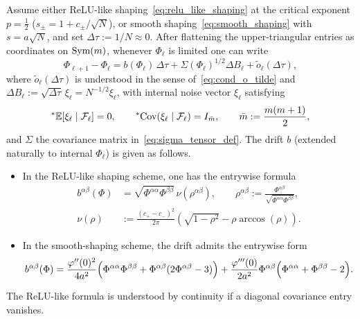 \begin{theorem}\label{thm:kem_increment}
Assume either ReLU-like shaping~\eqref{eq:relu_like_shaping} at the critical exponent $p = \frac{1}{2}$ ($s_\pm = 1 + c_\pm/\sqrt{N}$), or smooth shaping~\eqref{eq:smooth_shaping} with $s = a\sqrt{N}$, and set $\Delta\tau := 1/N \approx 0$. After flattening the upper-triangular entries as coordinates on $\operatorname{Sym}(m)$, whenever $\Phi_\ell$ is limited one can write
\begin{equation}\label{eq:kem_step}
\Phi_{\ell+1} - \Phi_\ell = b(\Phi_\ell)\,\Delta\tau + \Sigma(\Phi_\ell)^{1/2}\Delta B_\ell + \tilde{o}_\ell(\Delta\tau),
\end{equation}
where $\tilde{o}_\ell(\Delta\tau)$ is understood in the sense of~\eqref{eq:cond_o_tilde} and $\Delta B_\ell := \sqrt{\Delta\tau}\,\xi_\ell = N^{-1/2}\xi_\ell$, with internal noise vector $\xi_\ell$ satisfying
\begin{equation}\label{eq:xi_cond_cov}
{}^*\mathbb{E}[\xi_\ell \mid \mathcal{F}_\ell] = 0, \qquad {}^*\!\operatorname{Cov}(\xi_\ell \mid \mathcal{F}_\ell) = I_{\bar{m}}, \qquad \bar{m} := \frac{m(m+1)}{2},
\end{equation}
and $\Sigma$ the covariance matrix in~\eqref{eq:sigma_tensor_def}. The drift $b$ (extended naturally to internal $\Phi_\ell$) is given as follows.
\begin{itemize}
\item In the ReLU-like shaping scheme, one has the entrywise formula
\begin{equation}\label{eq:drift_relu_like}
\begin{aligned}
b^{\alpha\beta}(\Phi) &= \sqrt{\Phi^{\alpha\alpha}\Phi^{\beta\beta}}\,\nu(\rho^{\alpha\beta}), \qquad \rho^{\alpha\beta} := \frac{\Phi^{\alpha\beta}}{\sqrt{\Phi^{\alpha\alpha}\Phi^{\beta\beta}}}, \\
\nu(\rho) &:= \frac{(c_+ - c_-)^2}{2\pi}\left(\sqrt{1 - \rho^2} - \rho\arccos(\rho)\right).
\end{aligned}
\end{equation}
\item In the smooth-shaping scheme, the drift admits the entrywise form
\begin{equation}\label{eq:drift_smooth}
b^{\alpha\beta}(\Phi) = \frac{\varphi''(0)^2}{4a^2}\Bigl(\Phi^{\alpha\alpha}\Phi^{\beta\beta} + \Phi^{\alpha\beta}(2\Phi^{\alpha\beta} - 3)\Bigr) + \frac{\varphi'''(0)}{2a^2}\Phi^{\alpha\beta}\Bigl(\Phi^{\alpha\alpha} + \Phi^{\beta\beta} - 2\Bigr).
\end{equation}
\end{itemize}
The ReLU-like formula is understood by continuity if a diagonal covariance entry vanishes.
\end{theorem}

